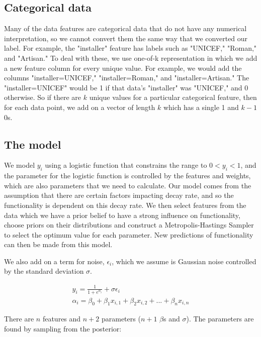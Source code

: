 \documentclass{article} %
\begin{document}
\subsection{Categorical data}

Many of the data features are categorical data that do not have any numerical interpretation, so we cannot convert them the same way that we converted our label. For example, the "installer" feature has labels such as "UNICEF," "Roman," and "Artisan." To deal with these, we use one-of-k representation in which we add a new feature column for every unique value. For example, we would add the columns "installer=UNICEF," "installer=Roman," and "installer=Artisan." The "installer=UNICEF" would be 1 if that data's "installer" was "UNICEF," and 0 otherwise. So if there are $k$ unique values for a particular categorical feature, then for each data point, we add on a vector of length $k$ which has a single 1 and $k-1$ 0s.

\subsection{The model}

We model $y_i$ using a logistic function that constrains the range to $0 < y_i < 1$, and the parameter for the logistic function is controlled by the features and weights, which are also parameters that we need to calculate. Our model comes from the assumption that there are certain factors impacting decay rate, and so the functionality is dependent on this decay rate.
We then select features from the data which we have a prior belief to have a strong influence on functionality, choose priors on their distributions and construct a Metropolis-Hastings Sampler to select the optimum value for each parameter. New predictions of functionality can then be made from this model.

We also add on a term for noise, $\epsilon_i$, which we assume is Gaussian noise controlled by the standard deviation $\sigma$.

\begin{gather*}
y_i = \frac{1}{1+e^{\alpha_i}}+\sigma\epsilon_i \\
\alpha_i = \beta_0 + \beta_1 x_{i,1} + \beta_2 x_{i,2} + ... + \beta_n x_{i,n}
\end{gather*}

There are $n$ features and $n+2$ parameters ($n+1$ $\beta$s and $\sigma$). The parameters are found by sampling from the posterior:
\end{document}
